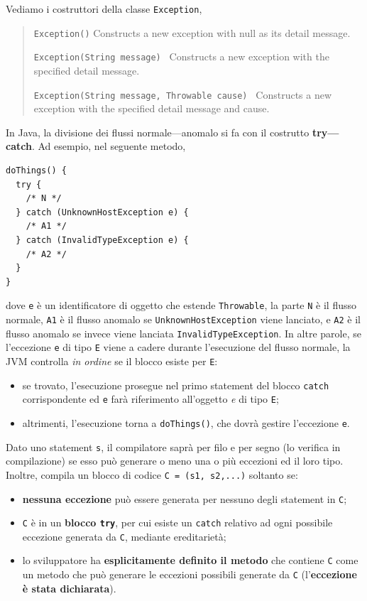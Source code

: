 \documentclass[\fontsizeclass,twocolumn]{\classname}
\theoremstyle{definition}
\theoremstyle{definition}
\begin{document}
Vediamo i costruttori della classe \texttt{Exception},
\begin{quote}
    \footnotesize{
        \texttt{Exception()} 	Constructs a new exception with null as its detail message.

        \texttt{Exception(String message) } Constructs a new exception with the specified detail message.

    \texttt{Exception(String message, Throwable cause) } Constructs a new exception with the specified detail message and cause.}
\end{quote}

In Java, la divisione dei flussi normale---anomalo si fa con il costrutto
\textbf{try---catch}. Ad esempio, nel seguente metodo,

\begin{lstlisting}
doThings() {
  try {
    /* N */
  } catch (UnknownHostException e) {
    /* A1 */
  } catch (InvalidTypeException e) {
    /* A2 */
  }
}
\end{lstlisting}

dove \texttt{e} è un identificatore di oggetto che estende \texttt{Throwable},
la parte \texttt{N} è il flusso normale, \texttt{A1} è il flusso anomalo se
\texttt{UnknownHostException} viene lanciato, e \texttt{A2} è il flusso anomalo
se invece viene lanciata \texttt{InvalidTypeException}. In altre parole, se
l'eccezione \texttt{e} di tipo \texttt{E} viene a cadere durante l'esecuzione
del flusso normale, la JVM controlla \emph{in ordine} se il blocco esiste per
\texttt{E}:
\begin{itemize}
    \item se trovato, l'esecuzione prosegue nel primo statement del blocco
        \texttt{catch} corrispondente ed \texttt{e} farà riferimento
        all'oggetto \emph{e} di tipo \texttt{E};
    \item altrimenti, l'esecuzione torna a \texttt{doThings()}, che dovrà
        gestire l'eccezione \texttt{e}.
\end{itemize}

Dato uno statement \texttt{s}, il compilatore saprà per filo e per segno (lo
verifica in compilazione) se esso può generare o meno una o più eccezioni ed il
loro tipo. Inoltre, compila un blocco di codice \texttt{C = (s1, s2,...)} soltanto se:
\begin{itemize}
    \item \textbf{nessuna eccezione} può essere generata per nessuno degli
        statement in \texttt{C};
    \item \texttt{C} è in un \textbf{blocco \texttt{try}}, per cui esiste un
        \texttt{catch} relativo ad ogni possibile eccezione generata da
        \texttt{C}, mediante ereditarietà;
    \item lo sviluppatore ha \textbf{esplicitamente definito il metodo} che
        contiene \texttt{C} come un metodo che può generare le eccezioni
        possibili generate da \texttt{C} (l'\textbf{eccezione è stata
        dichiarata}).
\end{itemize}
\end{document}
